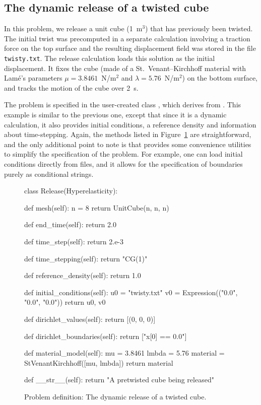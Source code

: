 \subsection{The dynamic release of a twisted cube}

In this problem, we release a unit cube (1~m$^3$) that has previously
been twisted. The initial twist was precomputed in a separate
calculation involving a traction force on the top surface and the
resulting displacement field was stored in the file {\tt
twisty.txt}. The release calculation loads this solution as the
initial displacement. It fixes the cube (made of a
St.~Venant--Kirchhoff material with Lam\'e's parameters $\mu =
3.8461$~N/m$^2$ and $\lambda = 5.76$~N/m$^2$) on the bottom surface,
and tracks the motion of the cube over 2~s.

The problem is specified in the user-created class ,
which derives from . This example is similar to
the previous one, except that since it is a dynamic calculation, it also
provides initial conditions, a reference density and information about
time-stepping. Again, the methods listed in
Figure~\ref{code:narayanan:dynamicrelease} are straightforward, and
the only additional point to note is that \twist{} provides some
convenience utilities to simplify the specification of the
problem. For example, one can load initial conditions directly from
files, and it allows for the specification of boundaries purely as
conditional strings.

\begin{figure}
\bwfig
\begin{python}
class Release(Hyperelasticity):

    def mesh(self):
        n = 8
        return UnitCube(n, n, n)

    def end_time(self):
        return 2.0

    def time_step(self):
        return 2.e-3

    def time_stepping(self):
        return "CG(1)"

    def reference_density(self):
        return 1.0

    def initial_conditions(self):
        u0 = "twisty.txt"
        v0 = Expression(("0.0", "0.0", "0.0"))
        return u0, v0

    def dirichlet_values(self):
        return [(0, 0, 0)]

    def dirichlet_boundaries(self):
        return ["x[0] == 0.0"]

    def material_model(self):
        mu    = 3.8461
        lmbda = 5.76
        material = StVenantKirchhoff([mu, lmbda])
        return material

    def __str__(self):
        return "A pretwisted cube being released"
\end{python}
\caption{Problem definition: The dynamic release of a twisted cube.}
\label{code:narayanan:dynamicrelease}
\end{figure}

